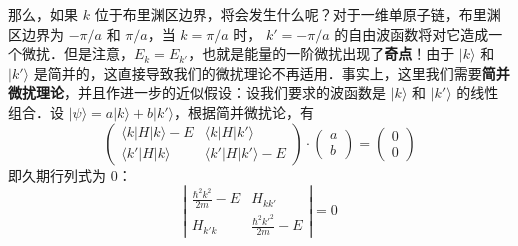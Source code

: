 那么，如果 $k$ 位于布里渊区边界，将会发生什么呢？对于一维单原子链，布里渊区边界为 $-\pi/a$ 和 $\pi/a$，当 $k=\pi/a$ 时， $k'=-\pi/a$ 的自由波函数将对它造成一个微扰．但是注意，$E_k=E_{k'}$，也就是能量的一阶微扰出现了\textbf{奇点}！由于 $|k\rangle$ 和 $|k'\rangle$ 是简并的，这直接导致我们的微扰理论不再适用．事实上，这里我们需要\textbf{简并微扰理论}，并且作进一步的近似假设：设我们要求的波函数是 $|k\rangle$ 和 $|k'\rangle$ 的线性组合．设 $|\psi\rangle=a|k\rangle+b|k'\rangle$，根据简并微扰论，有
\begin{equation}
\begin{pmatrix}
\langle k|H|k\rangle-E & \langle k|H|k'\rangle \\
\langle k'|H|k\rangle & \langle k'|H|k'\rangle - E   
\end{pmatrix}
\cdot
\begin{pmatrix}
a \\ b
\end{pmatrix}=
\begin{pmatrix}
0\\0
\end{pmatrix}
\end{equation}
即久期行列式为 $0$：
\begin{equation}
\left|
\begin{matrix}
\frac{\hbar^2 k^2}{2m}-E & H_{k k'}\\
H_{k'k}  & \frac{\hbar^2 k'^2}{2m}-E
\end{matrix}
\right|
=0
\end{equation}
